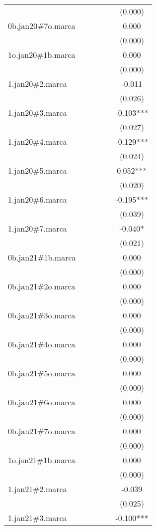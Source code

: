 \begin{tabular}{lccccc}
 &  &  &  &  & (0.000) \\
0b.jan20\#7o.marca &  &  &  &  & 0.000 \\
 &  &  &  &  & (0.000) \\
1o.jan20\#1b.marca &  &  &  &  & 0.000 \\
 &  &  &  &  & (0.000) \\
1.jan20\#2.marca &  &  &  &  & -0.011 \\
 &  &  &  &  & (0.026) \\
1.jan20\#3.marca &  &  &  &  & -0.103*** \\
 &  &  &  &  & (0.027) \\
1.jan20\#4.marca &  &  &  &  & -0.129*** \\
 &  &  &  &  & (0.024) \\
1.jan20\#5.marca &  &  &  &  & 0.052*** \\
 &  &  &  &  & (0.020) \\
1.jan20\#6.marca &  &  &  &  & -0.195*** \\
 &  &  &  &  & (0.039) \\
1.jan20\#7.marca &  &  &  &  & -0.040* \\
 &  &  &  &  & (0.021) \\
0b.jan21\#1b.marca &  &  &  &  & 0.000 \\
 &  &  &  &  & (0.000) \\
0b.jan21\#2o.marca &  &  &  &  & 0.000 \\
 &  &  &  &  & (0.000) \\
0b.jan21\#3o.marca &  &  &  &  & 0.000 \\
 &  &  &  &  & (0.000) \\
0b.jan21\#4o.marca &  &  &  &  & 0.000 \\
 &  &  &  &  & (0.000) \\
0b.jan21\#5o.marca &  &  &  &  & 0.000 \\
 &  &  &  &  & (0.000) \\
0b.jan21\#6o.marca &  &  &  &  & 0.000 \\
 &  &  &  &  & (0.000) \\
0b.jan21\#7o.marca &  &  &  &  & 0.000 \\
 &  &  &  &  & (0.000) \\
1o.jan21\#1b.marca &  &  &  &  & 0.000 \\
 &  &  &  &  & (0.000) \\
1.jan21\#2.marca &  &  &  &  & -0.039 \\
 &  &  &  &  & (0.025) \\
1.jan21\#3.marca &  &  &  &  & -0.100*** \\

\end{tabular}

